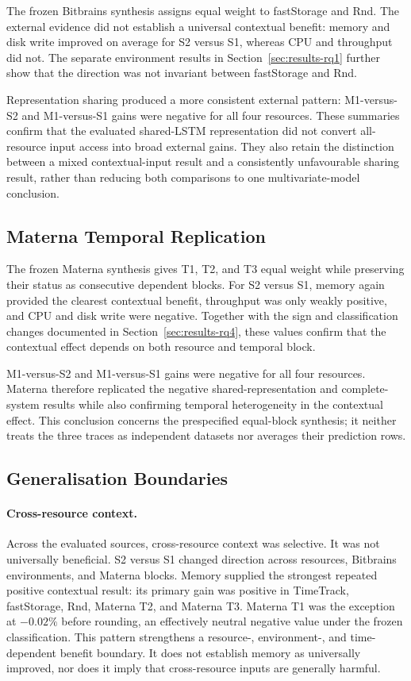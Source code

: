 \documentclass[a4paper,fleqn]{cas-dc}
\begin{document}
The frozen Bitbrains synthesis assigns equal weight to fastStorage and Rnd.
The external evidence did not establish a universal contextual benefit:
memory and disk write improved on average for S2 versus S1,
whereas CPU and throughput did not. The separate environment results in
Section~\ref{sec:results-rq1} further show that the direction was not invariant
between fastStorage and Rnd.

Representation sharing produced a more consistent external pattern:
M1-versus-S2 and M1-versus-S1 gains were negative for all four resources.
These summaries confirm that
the evaluated shared-LSTM representation did not convert all-resource input
access into broad external gains. They also retain the distinction between a
mixed contextual-input result and a consistently unfavourable sharing result,
rather than reducing both comparisons to one multivariate-model conclusion.

\subsection{Materna Temporal Replication}

The frozen Materna synthesis gives T1, T2, and T3 equal weight while preserving
their status as consecutive dependent blocks. For S2 versus S1, memory again
provided the clearest contextual
benefit, throughput was only weakly positive, and CPU and disk write were
negative. Together with the sign and classification changes documented in
Section~\ref{sec:results-rq4}, these values confirm that the contextual effect
depends on both resource and temporal block.

M1-versus-S2 and M1-versus-S1 gains were negative for all four resources.
Materna therefore replicated the negative
shared-representation and complete-system results while also confirming
temporal heterogeneity in the contextual effect. This conclusion concerns the
prespecified equal-block synthesis; it neither treats the three traces as
independent datasets nor averages their prediction rows.

\subsection{Generalisation Boundaries}

\paragraph{Cross-resource context.}
Across the evaluated sources, cross-resource context was selective. It was not
universally beneficial. S2 versus S1 changed direction across resources,
Bitbrains environments, and Materna blocks. Memory supplied the strongest
repeated positive contextual result: its primary gain was positive in
TimeTrack, fastStorage, Rnd, Materna T2, and Materna T3. Materna T1 was the
exception at $-0.02\%$ before rounding, an effectively neutral negative value
under the frozen classification. This pattern strengthens a resource-,
environment-, and time-dependent benefit boundary. It does not establish
memory as universally improved, nor does it imply that cross-resource inputs
are generally harmful.
\end{document}
